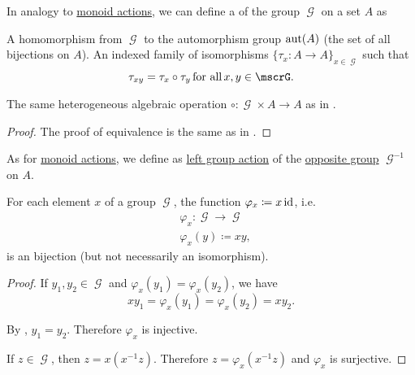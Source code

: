 \begin{definition}\label{def:left_group_action}
  In analogy to \hyperref[def:left_monoid_action]{monoid actions}, we can define a  of the group \( \mscrG \) on a set \( A \) as
  \begin{DefEnum}
     A homomorphism from \( \mscrG \) to the automorphism group \( \operatorname{aut}(A) \) (the set of all bijections on \( A \)).
     An indexed family of isomorphisms \( \{ \tau_x: A \to A \}_{x \in \mscrG} \) such that
    \begin{equation}\label{eq:def:left_group_action/indirect_homomorphism}
      \tau_{xy} = \tau_x \circ \tau_y \T{for all} x, y \in \mscrG.
    \end{equation}

     The same heterogeneous algebraic operation \( \circ: \mscrG \times A \to A \) as in .
  \end{DefEnum}
\end{definition}
\begin{proof}
  The proof of equivalence is the same as in .
\end{proof}

\begin{definition}\label{def:right_group_action}
  As for \hyperref[def:right_monoid_action]{monoid actions}, we define  as \hyperref[def:left_group_action]{left group action} of the \hyperref[def:magma/opposite]{opposite group} \( \mscrG^{-1} \) on \( A \).
\end{definition}

\begin{lemma}\label{thm:group_multiplication_is_bijection}
  For each element \( x \) of a group \( \mscrG \), the function \( \varphi_x \coloneqq x\operatorname{id} \), i.e.
  \begin{align*}
    &\varphi_x: \mscrG \to \mscrG \\
    &\varphi_x(y) \coloneqq xy,
  \end{align*}
  is an bijection (but not necessarily an isomorphism).
\end{lemma}
\begin{proof}
   If \( y_1, y_2 \in \mscrG \) and \( \varphi_x(y_1) = \varphi_x(y_2) \), we have
  \begin{equation*}
    xy_1 = \varphi_x(y_1) = \varphi_x(y_2) = xy_2.
  \end{equation*}

  By , \( y_1 = y_2 \). Therefore \( \varphi_x \) is injective.

   If \( z \in \mscrG \), then \( z = x(x^{-1} z) \). Therefore \( z = \varphi_x(x^{-1} z) \) and \( \varphi_x \) is surjective.
\end{proof}

